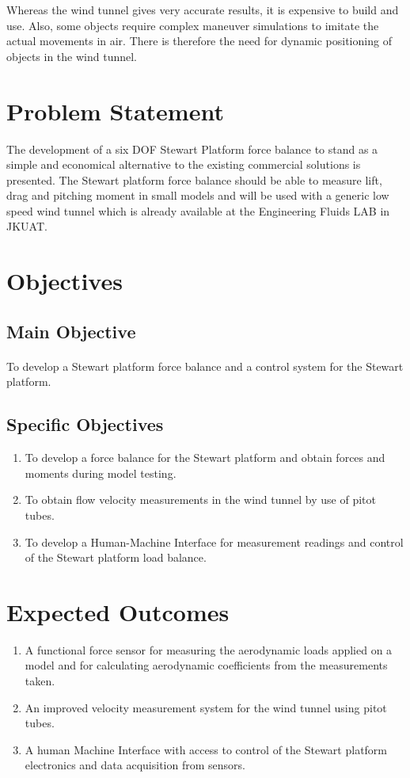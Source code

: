 Whereas the wind tunnel gives very accurate results, it is expensive to build and use. Also, some objects require complex maneuver simulations to imitate the actual movements in air. There is therefore the need for dynamic positioning of objects in the wind tunnel.
\section{Problem Statement}
 The development of a six DOF Stewart Platform force balance to stand as a simple and economical alternative to the existing commercial solutions is presented. The Stewart platform force balance should be able to measure lift, drag and pitching moment in small models and will be used with a generic low speed wind tunnel which is already available at the Engineering Fluids LAB in JKUAT.
\section{Objectives}
\subsection{Main Objective}
\paragraph{} To develop a Stewart platform force balance and a control system for the Stewart platform. 
\subsection{Specific Objectives}
\begin{enumerate}
\item To develop a force balance for the Stewart platform and obtain forces and moments during model testing.
\item To obtain flow velocity measurements in the wind tunnel by use of pitot tubes.
\item To develop a Human-Machine Interface for measurement readings and control of the Stewart platform load balance.
\end{enumerate}
\section{Expected Outcomes}
\begin{enumerate}
\item A functional force sensor for measuring the aerodynamic loads applied on a model
and for calculating aerodynamic coefficients from the measurements taken.
\item An improved velocity measurement system for the wind tunnel using pitot tubes.
\item A human Machine Interface with access to control of the Stewart platform electronics
and data acquisition from sensors.
\end{enumerate}
